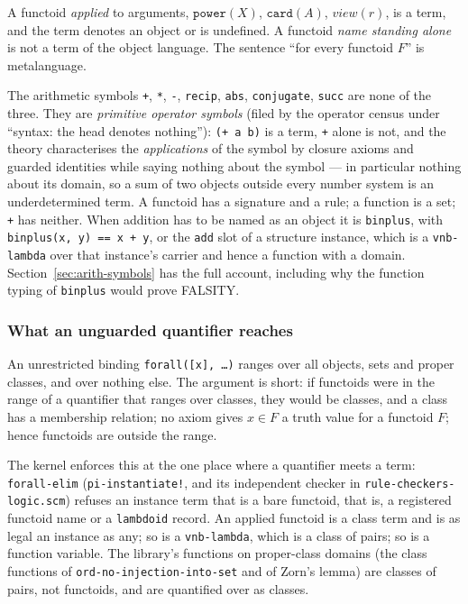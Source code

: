 A functoid \emph{applied} to arguments, $\texttt{power}(X)$,
$\texttt{card}(A)$, $\mathit{view}(r)$, is a term, and the term denotes an
object or is undefined.  A functoid \emph{name standing alone} is not a
term of the object language.  The sentence ``for every functoid $F$'' is
metalanguage.

The arithmetic symbols \texttt{+}, \texttt{*}, \texttt{-}, \texttt{recip},
\texttt{abs}, \texttt{conjugate}, \texttt{succ} are none of the three.  They
are \emph{primitive operator symbols} (filed by the operator census under
``syntax: the head denotes nothing''): \texttt{(+ a b)} is a term, \texttt{+} alone is not, and the theory
characterises the \emph{applications} of the symbol by closure axioms and
guarded identities while saying nothing about the symbol --- in particular
nothing about its domain, so a sum of two objects outside every number system
is an underdetermined term.  A functoid has a signature and a rule; a
function is a set; \texttt{+} has neither.  When addition has to be named as
an object it is \texttt{binplus}, with \texttt{binplus(x, y) == x + y}, or the
\texttt{add} slot of a structure instance, which is a \texttt{vnb-lambda} over
that instance's carrier and hence a function with a domain.
Section~\ref{sec:arith-symbols} has the full account, including why the
function typing of \texttt{binplus} would prove FALSITY.

\subsubsection{What an unguarded quantifier reaches}

An unrestricted binding \texttt{forall([x], \ldots)} ranges over all
objects, sets and proper classes, and over nothing else.  The argument is
short: if functoids were in the range of a quantifier that ranges over
classes, they would be classes, and a class has a membership relation; no
axiom gives $x \in F$ a truth value for a functoid $F$; hence functoids are
outside the range.

The kernel enforces this at the one place where a quantifier meets a term:
\texttt{forall-elim} (\texttt{pi-instantiate!}, and its independent checker
in \texttt{rule-checkers-logic.scm}) refuses an instance term that is a
bare functoid, that is, a registered functoid name or a \texttt{lambdoid}
record.  An applied functoid is a class term and is as legal an instance as
any; so is a \texttt{vnb-lambda}, which is a class of pairs; so is a function
variable.  The library's functions on proper-class domains (the class
functions of \texttt{ord-no-injection-into-set} and of Zorn's lemma) are
classes of pairs, not functoids, and are quantified over as classes.

